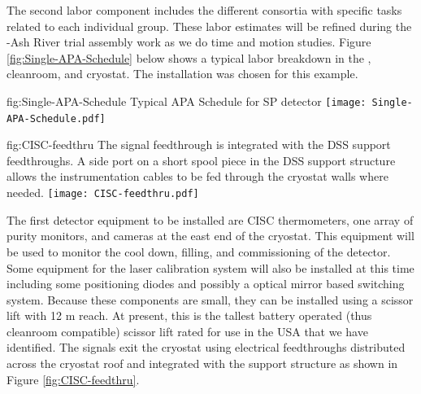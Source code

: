 The second labor component includes the different consortia with specific tasks related to each individual group. These labor estimates will be refined during the -Ash River trial assembly work as we do time and motion studies. Figure \ref{fig:Single-APA-Schedule} below shows a typical labor breakdown in the , cleanroom, and cryostat. The  installation was chosen for this example.

\begin{dunefigure}
{fig:Single-APA-Schedule}
{Typical APA Schedule for SP detector}
\texttt{[image: Single-APA-Schedule.pdf]}
\end{dunefigure}

\begin{dunefigure}{fig:CISC-feedthru}
{The signal feedthrough is integrated with the DSS support feedthroughs. A side port on a short spool piece in the DSS support structure allows the instrumentation cables to be fed through the cryostat walls where needed.}
\texttt{[image: CISC-feedthru.pdf]}
\end{dunefigure}



The first detector equipment to be installed are CISC thermometers,
one array of purity monitors, and cameras at the east end of the cryostat. 
This equipment will be used to monitor the cool down, filling, and commissioning of the detector. Some equipment for the laser calibration system will also be installed at this time including some positioning diodes and possibly a optical mirror based switching system. 
Because these components are small, they can be installed using a scissor lift with 12 \si{m} reach. 
At present, this is the tallest battery operated (thus cleanroom compatible) scissor lift rated for use in the USA that we have identified. The signals exit the cryostat using electrical feedthroughs distributed across the cryostat roof and integrated with the  support structure as shown in Figure \ref{fig:CISC-feedthru}.

